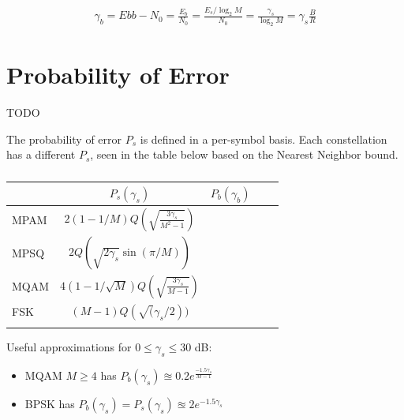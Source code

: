 \documentclass[12pt]{report} %
\begin{document}
\begin{align}
  \gamma_b = Ebb-N_0 = \frac{E_b}{N_0} = \frac{ E_s/\log _{2} M}{N_0} = \frac{\gamma_s}{\log _{2} M} = \gamma_s \frac{B}{R}
\end{align}

\section{Probability of Error}
TODO

The probability of error $P_s$ is defined in a per-symbol basis. Each constellation has a different $P_s$, seen in the table below based on the Nearest Neighbor bound.

\begin{table}[htbp]
  \centering
  \caption{}
  \begin{tabular}{lcccc}                                                                                \\
    \cmidrule(r){1-3} & $P_s(\gamma_s)$                                  & $P_b(\gamma_b)$ \\
    \midrule MPAM     & $2(1-1/M)Q(\sqrt{\frac{3\gamma_s}{M^2-1}})$      &                 \\
    \midrule MPSQ     & $2Q(\sqrt{2\gamma_s}\sin(\pi/M))$                                  \\
    \midrule MQAM     & $4(1-1/\sqrt{M})Q(\sqrt{\frac{3\gamma_s}{M-1}})$                   \\
    \midrule FSK      & $(M-1)Q(\sqrt(\gamma_s/2))$                                        \\
    \\

    \bottomrule
  \end{tabular}
  \label{tab:constellation_pe}
\end{table}

Useful approximations for $0 \leq \gamma_s \leq 30$ dB:
\begin{itemize}
  \item MQAM $M \geq 4$ has $P_b(\gamma_s) \approxeq 0.2 e^{\frac{-1.5\gamma_s}{M-1}}$
  \item BPSK has $P_b(\gamma_s) = P_s(\gamma_s) \approxeq 2 e^{-1.5\gamma_s}$
\end{itemize}

\printglossary[type=\acronymtype,title=Acronyms]

% 
% 
\end{document}
